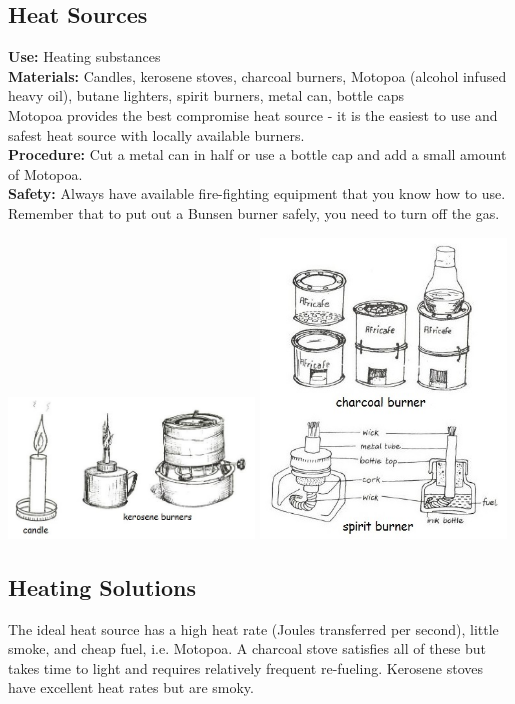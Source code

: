 \begin{multicols}{2}
\section{Heat Sources}
\label{sec:heatsources}
\vspace{-10pt}
\textbf{Use:} Heating substances\\
\textbf{Materials:} Candles, kerosene stoves, charcoal burners, Motopoa (alcohol infused heavy oil), butane lighters, spirit burners, metal can, bottle caps \\
Motopoa provides the best compromise heat source - it is the easiest to use and safest heat source with locally available burners.\\
\textbf{Procedure:} Cut a metal can in half or use a bottle cap and add a small amount of Motopoa.\\
\textbf{Safety:} Always have available fire-fighting equipment that you know how to use. Remember that to put out a Bunsen burner safely, you need to turn off the gas.
\begin{center}
\includegraphics[width=0.49\textwidth]{./img/source/heat-sources.jpg}
\includegraphics[width=0.49\textwidth]{./img/source/heat-sources-2.jpg}
\end{center}

\subsection{Heating Solutions}
The ideal heat source has a high heat rate (Joules transferred per second), 
little smoke, 
and cheap fuel, i.e. Motopoa.
A charcoal stove satisfies all of these 
but takes time to light and requires relatively frequent re-fueling. 
Kerosene stoves have excellent heat rates but are smoky. 


\end{multicols}
